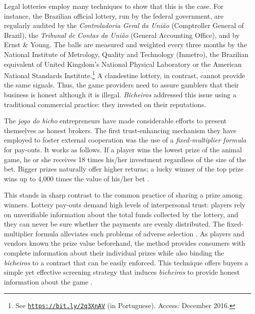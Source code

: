 \documentclass[a4paper,12pt]{article}
\begin{document}
Legal lotteries employ many techniques to show that this is the case. For instance, the Brazilian official lottery, run by the federal government, are regularly audited by the \textit{Controladoria Geral da União} (Comptroller General of Brazil), the \textit{Tribunal de Contas da União} (General Accounting Office), and by Ernst \& Young. The balls are measured and weighted every three months by the National Institute of Metrology, Quality and Technology (Inmetro), the Brazilian equivalent of United Kingdom's National Physical Laboratory or the American National Standards Institute.\footnote{See \href{http://noticias.uol.com.br/cotidiano/ultimas-noticias/2016/04/08/auditoria-dos-sorteios-da-caixa-e-confiavel-veja-como-e-o-processo.htm}{\texttt{https://bit.ly/2q3XnAV}} (in Portuguese). Access: December 2016.} A clandestine lottery, in contrast, cannot provide the same signals. Thus, the game providers need to assure gamblers that their business is honest although it is illegal. \textit{Bicheiros} addressed this issue using a traditional commercial practice: they invested on their reputations.   

The \textit{jogo do bicho} entrepreneurs have made considerable efforts to present themselves as honest brokers. The first trust-enhancing mechanism they have employed to foster external cooperation was the use of a \textit{fixed-multiplier formula} for pay-outs. It works as follows. If a player wins the lowest prize of the animal game, he or she receives 18 times his/her investment regardless of the size of the bet. Bigger prizes naturally offer higher returns; a lucky winner of the top prize wins up to 4,000 times the value of his/her bet \citetext{\citealp[89]{labronici2012paratodos}; \citealp[20]{magalhaes2005ganhou}}.

This stands in sharp contrast to the common practice of sharing a prize among winners. Lottery pay-outs demand high levels of interpersonal trust: players rely on unverifiable information about the total funds collected by the lottery, and they can never be sure whether the payments are evenly distributed. The fixed-multiplier formula alleviates such problems of adverse selection \citep{akerlof1970market, cohen2010testing, levin2001information}. As players and vendors known the prize value beforehand, the method provides consumers with complete information about their individual prizes while also binding the \textit{bicheiros} to a contract that can be easily enforced. This technique offers buyers a simple yet effective screening strategy that induces \textit{bicheiros} to provide honest information about the game \citep{spence1973job, stiglitz1981credit}.
\end{document}
